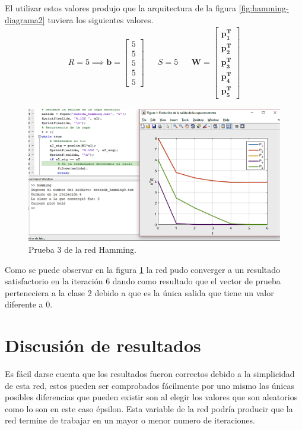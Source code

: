 \documentclass[12pt, titlepage]{article}
\begin{document}
    El utilizar estos valores produjo que la arquitectura de la figura \ref{fig:hamming-diagrama2} tuviera los siguientes valores.
    \begin{align*}
    R = 5 \implies \boldsymbol{b} = \left[\begin{array}{c}5 \\5 \\ 5 \\ 5 \\ 5\end{array}\right] && S = 5 && \boldsymbol{W} = \left[\begin{array}{c}\boldsymbol{p^{T}_1}\\ \boldsymbol{p^{T}_2} \\ \boldsymbol{p^{T}_3} \\ \boldsymbol{p^{T}_4} \\ \boldsymbol{p^{T}_5}\end{array}\right]
    \end{align*}
    \begin{figure}[H]
        \begin{center}
            \includegraphics[width=16cm]{img/hamming/hamming3.png}
            \caption{Prueba 3 de la red Hamming.}
            \label{fig:hamming3}
        \end{center}
    \end{figure}
    Como se puede observar en la figura \ref{fig:hamming3} la red pudo converger a un resultado satisfactorio en la iteración 6 dando como resultado que el vector de prueba perteneciera a la clase 2 debido a que es la única salida que tiene un valor diferente a 0.
    \newpage
    \section{Discusión de resultados}
    Es fácil darse cuenta que los resultados fueron correctos debido a la simplicidad de esta red, estos pueden ser comprobados fácilmente por uno mismo las únicas posibles diferencias que pueden existir son al elegir los valores que son aleatorios como lo son en este caso épsilon. Esta variable de la red podría producir que la red termine de trabajar en un mayor o menor numero de iteraciones.
    
\end{document}
